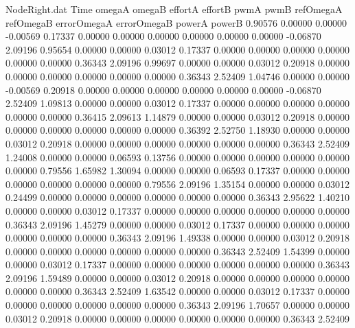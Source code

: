 \begin{filecontents}{NodeRight.dat}
Time omegaA omegaB effortA effortB pwmA pwmB refOmegaA refOmegaB errorOmegaA errorOmegaB powerA powerB
   0.90576    0.00000    0.00000    -0.00569    0.17337    0.00000    0.00000    0.00000    0.00000    0.00000    0.00000   -0.06870    2.09196
   0.95654    0.00000    0.00000     0.03012    0.17337    0.00000    0.00000    0.00000    0.00000    0.00000    0.00000    0.36343    2.09196
   0.99697    0.00000    0.00000     0.03012    0.20918    0.00000    0.00000    0.00000    0.00000    0.00000    0.00000    0.36343    2.52409
   1.04746    0.00000    0.00000    -0.00569    0.20918    0.00000    0.00000    0.00000    0.00000    0.00000    0.00000   -0.06870    2.52409
   1.09813    0.00000    0.00000     0.03012    0.17337    0.00000    0.00000    0.00000    0.00000    0.00000    0.00000    0.36415    2.09613
   1.14879    0.00000    0.00000     0.03012    0.20918    0.00000    0.00000    0.00000    0.00000    0.00000    0.00000    0.36392    2.52750
   1.18930    0.00000    0.00000     0.03012    0.20918    0.00000    0.00000    0.00000    0.00000    0.00000    0.00000    0.36343    2.52409
   1.24008    0.00000    0.00000     0.06593    0.13756    0.00000    0.00000    0.00000    0.00000    0.00000    0.00000    0.79556    1.65982
   1.30094    0.00000    0.00000     0.06593    0.17337    0.00000    0.00000    0.00000    0.00000    0.00000    0.00000    0.79556    2.09196
   1.35154    0.00000    0.00000     0.03012    0.24499    0.00000    0.00000    0.00000    0.00000    0.00000    0.00000    0.36343    2.95622
   1.40210    0.00000    0.00000     0.03012    0.17337    0.00000    0.00000    0.00000    0.00000    0.00000    0.00000    0.36343    2.09196
   1.45279    0.00000    0.00000     0.03012    0.17337    0.00000    0.00000    0.00000    0.00000    0.00000    0.00000    0.36343    2.09196
   1.49338    0.00000    0.00000     0.03012    0.20918    0.00000    0.00000    0.00000    0.00000    0.00000    0.00000    0.36343    2.52409
   1.54399    0.00000    0.00000     0.03012    0.17337    0.00000    0.00000    0.00000    0.00000    0.00000    0.00000    0.36343    2.09196
   1.59489    0.00000    0.00000     0.03012    0.20918    0.00000    0.00000    0.00000    0.00000    0.00000    0.00000    0.36343    2.52409
   1.63542    0.00000    0.00000     0.03012    0.17337    0.00000    0.00000    0.00000    0.00000    0.00000    0.00000    0.36343    2.09196
   1.70657    0.00000    0.00000     0.03012    0.20918    0.00000    0.00000    0.00000    0.00000    0.00000    0.00000    0.36343    2.52409

\end{filecontents}
